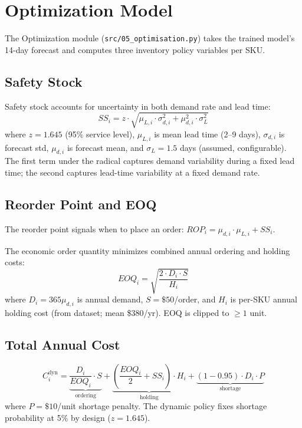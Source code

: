 \documentclass[11pt,letterpaper]{article}
\begin{document}
\section{Optimization Model}
\label{sec:optimisation}

The Optimization module (\texttt{src/05\_optimisation.py}) takes the trained model's 14-day forecast and computes three inventory policy variables per SKU.

\subsection{Safety Stock}

Safety stock accounts for uncertainty in both demand rate and lead time:
\begin{equation}
    SS_i = z \cdot \sqrt{\mu_{L,i} \cdot \sigma_{d,i}^2 + \mu_{d,i}^2 \cdot \sigma_L^2}
    \label{eq:safety-stock}
\end{equation}
where $z = 1.645$ (95\% service level), $\mu_{L,i}$ is mean lead time (2--9 days), $\sigma_{d,i}$ is forecast std, $\mu_{d,i}$ is forecast mean, and $\sigma_L = 1.5$ days (assumed, configurable). The first term under the radical captures demand variability during a fixed lead time; the second captures lead-time variability at a fixed demand rate.

\subsection{Reorder Point and EOQ}

The reorder point signals when to place an order: $ROP_i = \mu_{d,i} \cdot \mu_{L,i} + SS_i$.

The economic order quantity minimizes combined annual ordering and holding costs:
\begin{equation}
    EOQ_i = \sqrt{\frac{2 \cdot D_i \cdot S}{H_i}}
\end{equation}
where $D_i = 365\mu_{d,i}$ is annual demand, $S = \$50$/order, and $H_i$ is per-SKU annual holding cost (from dataset; mean \$380/yr). EOQ is clipped to $\geq 1$ unit.

\subsection{Total Annual Cost}

\begin{equation}
    C_i^{\text{dyn}} = \underbrace{\frac{D_i}{EOQ_i} \cdot S}_{\text{ordering}} + \underbrace{\left(\frac{EOQ_i}{2} + SS_i\right) \cdot H_i}_{\text{holding}} + \underbrace{(1 - 0.95) \cdot D_i \cdot P}_{\text{shortage}}
\end{equation}
where $P = \$10$/unit shortage penalty. The dynamic policy fixes shortage probability at 5\% by design ($z = 1.645$).
\end{document}
